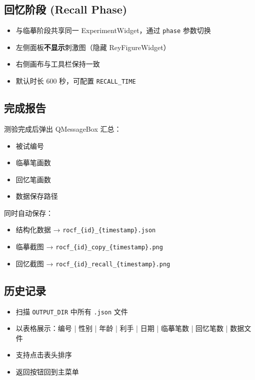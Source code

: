 \documentclass[12pt,a4paper]{ctexart}
\begin{document}
\subsection{回忆阶段 (Recall Phase)}

\begin{itemize}[leftmargin=*]
  \item 与临摹阶段共享同一 ExperimentWidget，通过 \texttt{phase} 参数切换
  \item 左侧面板\textbf{不显示}刺激图（隐藏 ReyFigureWidget）
  \item 右侧画布与工具栏保持一致
  \item 默认时长 600 秒，可配置 \texttt{RECALL\_TIME}
\end{itemize}

\subsection{完成报告}

测验完成后弹出 QMessageBox 汇总：
\begin{itemize}[leftmargin=*]
  \item 被试编号
  \item 临摹笔画数
  \item 回忆笔画数
  \item 数据保存路径
\end{itemize}

同时自动保存：
\begin{itemize}[leftmargin=*]
  \item 结构化数据 → \texttt{rocf\_\{id\}\_\{timestamp\}.json}
  \item 临摹截图 → \texttt{rocf\_\{id\}\_copy\_\{timestamp\}.png}
  \item 回忆截图 → \texttt{rocf\_\{id\}\_recall\_\{timestamp\}.png}
\end{itemize}

\subsection{历史记录}

\begin{itemize}[leftmargin=*]
  \item 扫描 \texttt{OUTPUT\_DIR} 中所有 \texttt{.json} 文件
  \item 以表格展示：编号 | 性别 | 年龄 | 利手 | 日期 | 临摹笔数 | 回忆笔数 | 数据文件
  \item 支持点击表头排序
  \item 返回按钮回到主菜单
\end{itemize}
\end{document}
